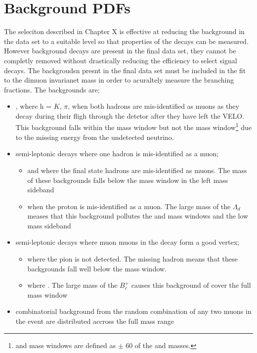 \section{Background PDFs}
\label{sec:backgrounds}
The seleciton described in Chapter X is effective at reducing the background in the data set to a suitable level so that properties of the \bmumu decays can be measured. However background decays are present in the final data set, they cannot be completly removed without drastically reducing the efficiency to select signal decays. The backgroudsn presnt in the final data set must be included in the fit to the dimuon invarianet mass in order to acuraltely measure the \bmumu branching fractions. The backgrounds are;
\begin{itemize}
\item \bhh, where h = $K$, $\pi$, when both hadrons are mis-identified as muons as they decay during their fligh through the detetor after they have left the VELO. This background falls within the \bd mass window but not the \bs mass window\footnote{\bd and \bs mass windows are defined as $\pm$ 60 \mevcc of the \bd and \bs masses.} due to the missing energy from the undetected neutrino. 
\item semi-leptonic decays where one hadron is mis-identified as a muon;
\begin{itemize}
\item \bdpimunu and \bsKmunu where the final state hadrons are mis-identified as muons. The mass of these backgrounds falls below the \bd mass window in the left mass sideband
\item \lambdab when the proton is mis-identified as a muon. The large mass of the $\Lambda_{d}$ meases that this background pollutes the \bs and \bd mass windows and the low mass sideband
\end{itemize}
\item semi-leptonic decays where muon muons in the decay form a good vertex;
\begin{itemize}
\item \bpimumu where the pion is not detected. The missing hadron means that these backgrounds fall well below the \bd mass window.
\item \bcjpsimunu where \jpsimumu. The large mass of the $B^{+}_{c}$ causes this background of cover the full mass window
\end{itemize}
\item combinatorial background from the random combination of any two muons in the event are distributed accross the full mass range
\end{itemize}

